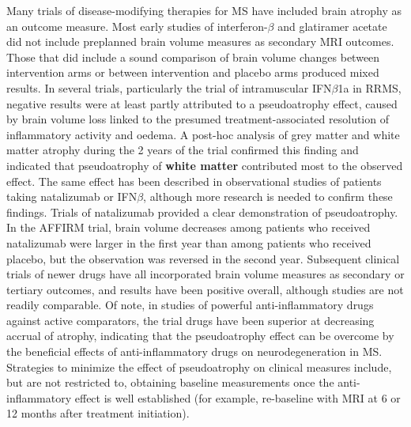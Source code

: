 \documentclass[final, paper=letter,5p,times,twocolumn]{elsarticle}
\theoremstyle{definition}
\begin{document}
Many trials of disease-modifying therapies for MS have included brain atrophy as an outcome measure. Most early studies of interferon-$\beta$ and glatiramer acetate did not include preplanned brain volume measures as secondary MRI outcomes. Those that did include a sound comparison of brain volume changes between intervention arms or between intervention and placebo arms produced mixed results. In several trials, particularly the trial of intramuscular IFN$\beta$1a in RRMS, negative results were at least partly attributed to a pseudoatrophy effect, caused by brain volume loss linked to the presumed treatment-associated resolution of inflammatory activity and oedema. A post-hoc analysis of grey matter and white matter atrophy during the 2 years of the trial confirmed this finding and indicated that pseudoatrophy of {\bf white matter} contributed most to the observed effect. The same effect has been described in observational studies of patients taking natalizumab or IFN$\beta$, although more research is needed to confirm these findings. Trials of natalizumab provided a clear demonstration of pseudoatrophy. In the AFFIRM trial, brain volume decreases among patients who received natalizumab were larger in the first year than among patients who received placebo, but the observation was reversed in the second year. Subsequent clinical trials of newer drugs have all incorporated brain volume measures as secondary or tertiary outcomes, and results have been positive overall, although studies are not readily comparable. Of note, in studies of powerful anti-inflammatory drugs against active comparators, the trial drugs have been superior at decreasing accrual of atrophy, indicating that the pseudoatrophy effect can be overcome by the beneficial effects of anti-inflammatory drugs on neurodegeneration in MS.\\
Strategies to minimize the effect of pseudoatrophy on clinical measures include, but are not restricted to, obtaining baseline measurements once the anti-inflammatory effect is well established (for example, re-baseline with MRI at 6 or 12 months after treatment initiation).
\end{document}

